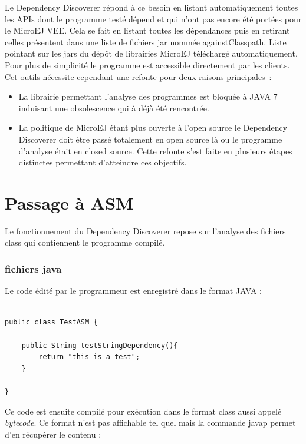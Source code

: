 \documentclass[french,a4paper,12pt]{report}
\begin{document}
Le Dependency Discoverer répond à ce besoin en listant automatiquement toutes les APIs dont le programme testé dépend et qui n’ont pas encore été portées pour le MicroEJ VEE. Cela se fait en listant toutes les dépendances puis en retirant celles présentent dans une liste de fichiers jar nommée againstClasspath. Liste pointant sur les jars du dépôt de librairies MicroEJ téléchargé automatiquement. Pour plus de simplicité le programme est accessible directement par les clients. Cet outils nécessite cependant une refonte pour deux raisons principales :

\begin{itemize}

\item La librairie permettant l’analyse des programmes est bloquée à JAVA 7 induisant une obsolescence qui à déjà été rencontrée.

\item La politique de MicroEJ étant plus ouverte à l’open source le Dependency Discoverer doit être passé totalement en open source là ou le programme d’analyse était en closed source.
Cette refonte s’est faite en plusieurs étapes distinctes permettant d’atteindre ces objectifs.

\end{itemize}

\section{Passage à ASM }

Le fonctionnement du Dependency Discoverer repose sur l'analyse des fichiers class qui contiennent le programme compilé. 

\bigskip

\subsubsection{fichiers java}

Le code édité par le programmeur est enregistré dans le format JAVA :

\begin{lstlisting}

public class TestASM {
	
	public String testStringDependency(){
		return "this is a test";
	}
	
}

\end{lstlisting}

Ce code est ensuite compilé pour exécution dans le format class aussi appelé \textit{bytecode}. Ce format n'est pas affichable tel quel mais la commande javap permet d'en récupérer le contenu :
\end{document}
